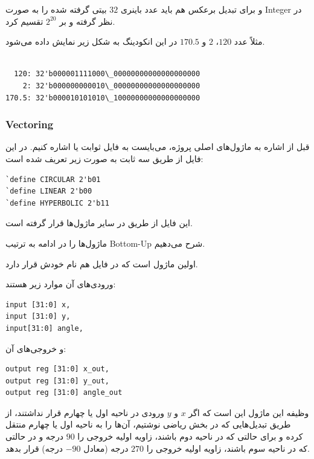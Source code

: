 \documentclass[12pt,titlepage,a4page , tikz , multi,table , svgnames,xcdraw]{article}
\begin{document}
و برای تبدیل برعکس هم باید عدد باینری $32$ بیتی گرفته شده را به صورت Integer در نظر گرفته و بر $2^{20}$ تقسیم کرد.

مثلاً عدد $120$، $2$ و $170.5$ در این انکودینگ به شکل زیر نمایش داده می‌شود.
 
 
 \begin{latin}
\begin{verbatim}

  120: 32'b000001111000\_00000000000000000000
    2: 32'b000000000010\_00000000000000000000
170.5: 32'b000010101010\_10000000000000000000
\end{verbatim}
\end{latin} 

 
\subsubsection{Vectoring}

قبل از اشاره به ماژول‌های اصلی پروژه، می‌بایست به فایل ثوابت یا  اشاره کنیم. در این فایل از طریق  سه ثابت به صورت زیر تعریف شده است:
\begin{latin}
\begin{verbatim}
`define CIRCULAR 2'b01
`define LINEAR 2'b00
`define HYPERBOLIC 2'b11
\end{verbatim}
\end{latin}

این فایل از طریق  در سایر ماژول‌ها قرار گرفته است.

ماژول‌ها را در ادامه به ترتیب Bottom-Up شرح می‌دهیم.

اولین ماژول  است که در فایل هم نام خودش قرار دارد. 

 ورودی‌های آن موارد زیر هستند:

\begin{latin}
\begin{verbatim}
input [31:0] x,
input [31:0] y,
input[31:0] angle,
\end{verbatim}
\end{latin}

و خروجی‌های آن:

\begin{latin}
\begin{verbatim}
output reg [31:0] x_out,
output reg [31:0] y_out,
output reg [31:0] angle_out
\end{verbatim}
\end{latin}

وظیفه این ماژول این است که اگر $x$ و $y$ ورودی در ناحیه اول یا چهارم قرار نداشتند، از طریق تبدیل‌هایی که در بخش ریاضی نوشتیم، آن‌ها را به ناحیه اول یا چهارم منتقل کرده و برای حالتی که در ناحیه دوم باشند، زاویه اولیه خروجی را $90$ درجه و در حالتی که در ناحیه سوم باشند، زاویه اولیه خروجی را $270$ درجه (معادل $-90$ درجه) قرار بدهد.
\end{document}
